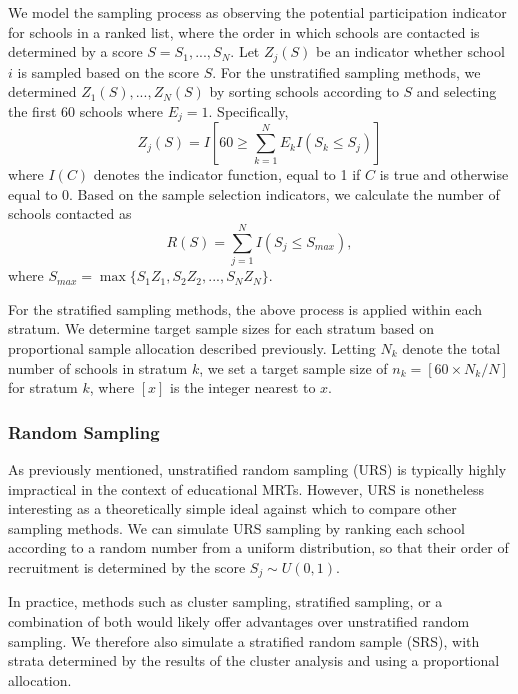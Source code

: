 \documentclass[
  english,
  man,floatsintext]{apa6}
\begin{document}
We model the sampling process as observing the potential participation indicator for schools in a ranked list, where the order in which schools are contacted is determined by a score \(S = S_1,...,S_N\). Let \(Z_j(S)\) be an indicator whether school \(i\) is sampled based on the score \(S\).
For the unstratified sampling methods, we determined \(Z_1(S),...,Z_N(S)\) by sorting schools according to \(S\) and selecting the first 60 schools where \(E_j = 1\).
Specifically,
\begin{equation}
\label{eq:Zj}
Z_j(S) = I\left[60 \geq \sum_{k=1}^N E_k I\left(S_k \leq S_j\right)\right]
\end{equation}
where \(I(C)\) denotes the indicator function, equal to 1 if \(C\) is true and otherwise equal to 0. Based on the sample selection indicators, we calculate the number of schools contacted as
\begin{equation}
\label{eq:R}
R(S) = \sum_{j=1}^N I(S_j \leq S_{max}),
\end{equation}
where \(S_{max} = \max \{S_1 Z_1, S_2 Z_2, ..., S_N Z_N\}\).

For the stratified sampling methods, the above process is applied within each stratum. We determine target sample sizes for each stratum based on proportional sample allocation described previously. Letting \(N_k\) denote the total number of schools in stratum \(k\), we set a target sample size of \(n_k = [60 \times N_k / N]\) for stratum \(k\), where \([x]\) is the integer nearest to \(x\).

\hypertarget{random-sampling}{%
\subsubsection{Random Sampling}\label{random-sampling}}

As previously mentioned, unstratified random sampling (URS) is typically highly impractical in the context of educational MRTs. However, URS is nonetheless interesting as a theoretically simple ideal against which to compare other sampling methods. We can simulate URS sampling by ranking each school according to a random number from a uniform distribution, so that their order of recruitment is determined by the score \(S_j \sim U(0, 1)\).

In practice, methods such as cluster sampling, stratified sampling, or a combination of both would likely offer advantages over unstratified random sampling. We therefore also simulate a stratified random sample (SRS), with strata determined by the results of the cluster analysis and using a proportional allocation.
\end{document}
